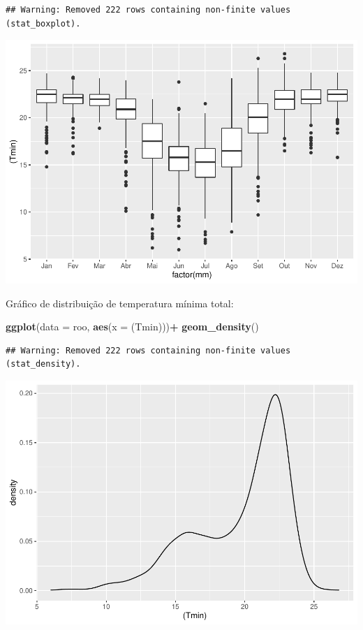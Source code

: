 \documentclass[
]{book}
\newenvironment{Shaded}{\begin{snugshade}}{\end{snugshade}}
\newcommand{\DataTypeTok}[1]{\textcolor[rgb]{0.13,0.29,0.53}{#1}}
\newcommand{\KeywordTok}[1]{\textcolor[rgb]{0.13,0.29,0.53}{\textbf{#1}}}
\newcommand{\NormalTok}[1]{#1}
\newcommand{\OperatorTok}[1]{\textcolor[rgb]{0.81,0.36,0.00}{\textbf{#1}}}
\newcommand{\StringTok}[1]{\textcolor[rgb]{0.31,0.60,0.02}{#1}}
\begin{document}
\begin{verbatim}
## Warning: Removed 222 rows containing non-finite values (stat_boxplot).
\end{verbatim}

\includegraphics{TudodoR_files/figure-latex/unnamed-chunk-241-1.pdf}

Gráfico de distribuição de temperatura mínima total:

\begin{Shaded}
\begin{Highlighting}[]
\KeywordTok{ggplot}\NormalTok{(}\DataTypeTok{data =}\NormalTok{ roo, }\KeywordTok{aes}\NormalTok{(}\DataTypeTok{x =}\NormalTok{ (Tmin)))}\OperatorTok{+}
\StringTok{  }\KeywordTok{geom_density}\NormalTok{()}
\end{Highlighting}
\end{Shaded}

\begin{verbatim}
## Warning: Removed 222 rows containing non-finite values (stat_density).
\end{verbatim}

\includegraphics{TudodoR_files/figure-latex/unnamed-chunk-242-1.pdf}
\end{document}

